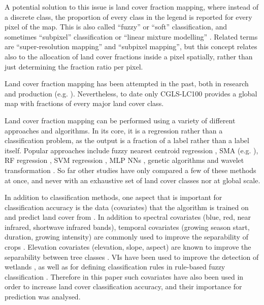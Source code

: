 \documentclass[review,authoryear,3p]{elsarticle}
\begin{document}
A potential solution to this issue is land cover fraction mapping, where instead of a discrete class, the proportion of every class in the legend is reported for every pixel of the map.
This is also called ``fuzzy'' or ``soft'' classification, and sometimes ``subpixel'' classification or ``linear mixture modelling'' \citep{Okeke2006fuzzyexponent}.
Related terms are ``super-resolution mapping'' and ``subpixel mapping'', but this concept relates also to the allocation of land cover fractions inside a pixel spatially, rather than just determining the fraction ratio per pixel.

Land cover fraction mapping has been attempted in the past, both in research \citep{adams_classification_1995, foody1996fuzzyevaluation, colditz_land_2011, sharma_assessing_2011, uma_shankar_wavelet-fuzzy_2011, dwivedi_optimisation_2012, lizarazo_quantitative_2012, gessner_estimating_2013, okujeni_generalizing_2018} and production (e.g. \citealp{hansen2000hardtree, hansen_continuous_2011, pengra_global_2015, hansen_global_2003, sexton_global_2013}).
Nevertheless, to date only \ac{CGLS-LC100} provides a global map with fractions of every major land cover class.

Land cover fraction mapping can be performed using a variety of different approaches and algorithms.
In its core, it is a regression rather than a classification problem, as the output is a fraction of a label rather than a label itself.
Popular approaches include fuzzy nearest centroid regression \citep{zhang2001fullyfuzzy}, \ac{SMA} (e.g. \citealp{yang_landsat_2012, hobbs2003linear, shimabukuro1991least}), \ac{RF} regression \citep{schwieder_estimating_2014}, \gls{SVM} regression \citep{schwieder_estimating_2014}, \gls{MLP} \glspl{NN} \citep{zhang2001fullyfuzzy}, genetic algorithms \citep{stavrakoudis_boosted_2011} and wavelet transformation \citep{uma_shankar_wavelet-fuzzy_2011}.
So far other studies have only compared a few of these methods at once, and never with an exhaustive set of land cover classes nor at global scale.

In addition to classification methods, one aspect that is important for classification accuracy is the data (covariates) that the algorithm is trained on and predict land cover from \citep{yu2014metadiscoveries}. In addition to spectral covariates (blue, red, near infrared, shortwave infrared bands), temporal covariates (growing season start, duration, growing intensity) are commonly used to improve the separability of crops \citep{jakubauskas2001harmonic}. Elevation covariates (elevation, slope, aspect) are known to improve the separability between tree classes \citep{burrough2001fuzzy}. \Glspl{VI} have been used to improve the detection of wetlands \citep{sader1995wetlands}, as well as for defining classification rules in rule-based fuzzy classification \citep{baraldi2006rulebased}. Therefore in this paper such covariates have also been used in order to increase land cover classification accuracy, and their importance for prediction was analysed.
\end{document}
